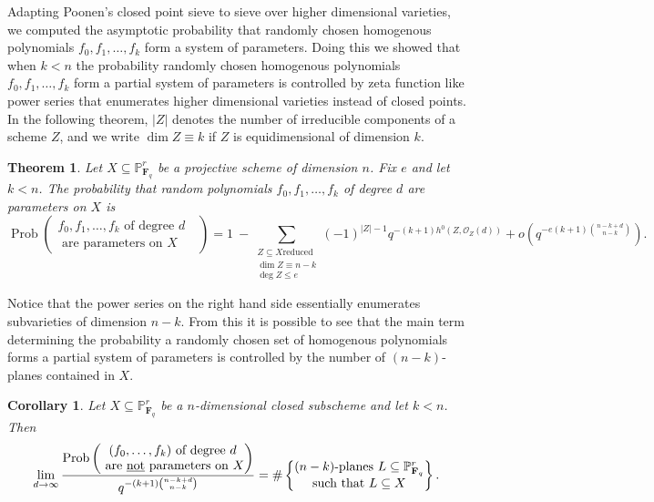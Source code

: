 \documentclass[10pt,reqno]{amsart}
\newtheorem{theorem}[lemma]{Theorem}
\newtheorem{cor}[lemma]{Corollary}
\theoremstyle{remark}
\newcommand{\Prob}{\operatorname{Prob}}
\newcommand{\fF}{\mathbf F}
\renewcommand{\O}{\mathcal{O}}
\renewcommand{\P}{\mathbb{P}}
\begin{document}
Adapting Poonen's closed point sieve to sieve over higher dimensional varieties, we computed the asymptotic probability that randomly chosen homogenous polynomials $f_{0},f_{1},\ldots,f_{k}$ form a system of parameters. Doing this we showed that when $k<n$ the probability randomly chosen homogenous polynomials $f_{0},f_{1},\ldots,f_{k}$ form a partial system of parameters is controlled by zeta function like power series that enumerates higher dimensional varieties instead of closed points. In the following theorem, $|Z|$ denotes the number of irreducible components of a scheme $Z$, and we write $\dim Z \equiv k$ if $Z$ is equidimensional of dimension $k$. 

\begin{theorem}\label{thm:main finite field}
Let $X\subseteq \P^r_{\fF_q}$ be a projective scheme of dimension $n$. Fix $e$ and let $k<n$. The probability that random polynomials $f_0,f_1,\dots,f_k$ of degree $d$ are parameters on $X$ is
\[
\Prob\left(\begin{matrix}f_0,f_1,\dots,f_{k} \text{ of degree $d$ } \\ \text{ are parameters on $X$}\end{matrix}\right) = 1 \ - 
\sum_{\begin{smallmatrix}Z\subseteq X \text{reduced} \\ \dim Z \equiv n-k\\ \deg Z \leq e  \end{smallmatrix}}(-1)^{|Z|-1}q^{-(k+1)h^0(Z,\O_Z(d))}+ o\left(q^{-e(k+1)\binom{n-k+d}{n-k}}\right).
\]
\end{theorem}

Notice that the power series on the right hand side essentially enumerates subvarieties of dimension $n-k$. From this it is possible to see that the main term determining the probability a randomly chosen set of homogenous polynomials forms a partial system of parameters is controlled by the number of $(n-k)$-planes contained in $X$. 

\begin{cor}\label{cor:error}
Let $X\subseteq \P^r_{\fF_q}$ be a $n$-dimensional closed subscheme and let $k<n$.  Then
\[
\lim_{d\to \infty} \frac{\Prob\left(\begin{matrix}(f_0,\dots,f_{k}) \text{ of degree $d$} \\ \text{ are \underline{not} parameters on $X$}\end{matrix}\right)} {q^{-(k+1)\binom{n-k+d}{n-k}}} = \#\left\{\begin{matrix}\text{$(n-k)$-planes } L\subseteq \P^r_{\fF_q}\\\text{such that }  L\subseteq X\end{matrix}\right\}.
\]
\end{cor} 
\end{document}
